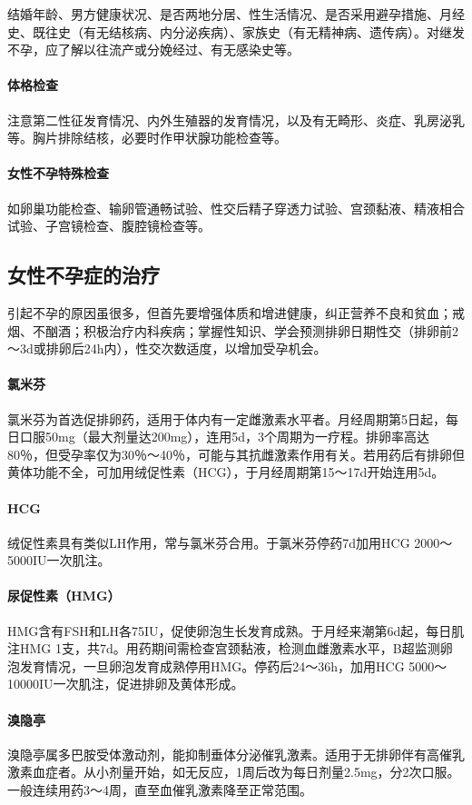 结婚年龄、男方健康状况、是否两地分居、性生活情况、是否采用避孕措施、月经史、既往史（有无结核病、内分泌疾病）、家族史（有无精神病、遗传病）。对继发不孕，应了解以往流产或分娩经过、有无感染史等。
\paragraph{体格检查}

注意第二性征发育情况、内外生殖器的发育情况，以及有无畸形、炎症、乳房泌乳等。胸片排除结核，必要时作甲状腺功能检查等。
\paragraph{女性不孕特殊检查}

如卵巢功能检查、输卵管通畅试验、性交后精子穿透力试验、宫颈黏液、精液相合试验、子宫镜检查、腹腔镜检查等。

\subsection{女性不孕症的治疗}

引起不孕的原因虽很多，但首先要增强体质和增进健康，纠正营养不良和贫血；戒烟、不酗酒；积极治疗内科疾病；掌握性知识、学会预测排卵日期性交（排卵前2～3d或排卵后24h内），性交次数适度，以增加受孕机会。
\paragraph{氯米芬}

氯米芬为首选促排卵药，适用于体内有一定雌激素水平者。月经周期第5日起，每日口服50mg（最大剂量达200mg），连用5d，3个周期为一疗程。排卵率高达80％，但受孕率仅为30％～40％，可能与其抗雌激素作用有关。若用药后有排卵但黄体功能不全，可加用绒促性素（HCG），于月经周期第15～17d开始连用5d。
\paragraph{HCG}

绒促性素具有类似LH作用，常与氯米芬合用。于氯米芬停药7d加用HCG
2000～5000IU一次肌注。
\paragraph{尿促性素（HMG）}

HMG含有FSH和LH各75IU，促使卵泡生长发育成熟。于月经来潮第6d起，每日肌注HMG
1支，共7d。用药期间需检查宫颈黏液，检测血雌激素水平，B超监测卵泡发育情况，一旦卵泡发育成熟停用HMG。停药后24～36h，加用HCG
5000～10000IU一次肌注，促进排卵及黄体形成。
\paragraph{溴隐亭}

溴隐亭属多巴胺受体激动剂，能抑制垂体分泌催乳激素。适用于无排卵伴有高催乳激素血症者。从小剂量开始，如无反应，1周后改为每日剂量2.5mg，分2次口服。一般连续用药3～4周，直至血催乳激素降至正常范围。